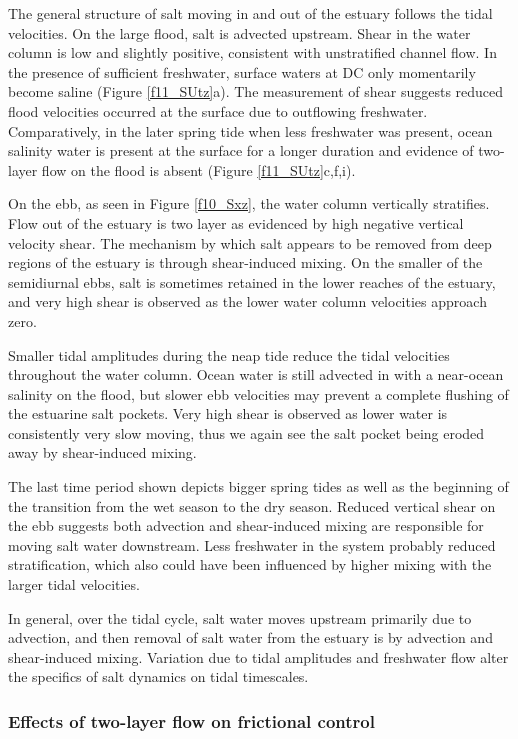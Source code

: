 The general structure of salt moving in and out of the estuary follows
the tidal velocities. On the large flood, salt is advected upstream.
Shear in the water column is low and slightly positive, consistent
with unstratified channel flow. In the presence of sufficient freshwater,
surface waters at DC only momentarily become saline (Figure \ref{f11_SUtz}a).
The measurement of shear suggests reduced flood velocities occurred
at the surface due to outflowing freshwater. Comparatively, in the
later spring tide when less freshwater was present, ocean salinity
water is present at the surface for a longer duration and evidence
of two-layer flow on the flood is absent (Figure \ref{f11_SUtz}c,f,i). 

On the ebb, as seen in Figure \ref{f10_Sxz}, the water column vertically
stratifies. Flow out of the estuary is two layer as evidenced by high
negative vertical velocity shear. The mechanism by which salt appears
to be removed from deep regions of the estuary is through shear-induced
mixing. On the smaller of the semidiurnal ebbs, salt is sometimes
retained in the lower reaches of the estuary, and very high shear
is observed as the lower water column velocities approach zero. 

Smaller tidal amplitudes during the neap tide reduce the tidal velocities
throughout the water column. Ocean water is still advected in with
a near-ocean salinity on the flood, but slower ebb velocities may
prevent a complete flushing of the estuarine salt pockets. Very high
shear is observed as lower water is consistently very slow moving,
thus we again see the salt pocket being eroded away by shear-induced
mixing. 

The last time period shown depicts bigger spring tides as well as
the beginning of the transition from the wet season to the dry season.
Reduced vertical shear on the ebb suggests both advection and shear-induced
mixing are responsible for moving salt water downstream. Less freshwater
in the system probably reduced stratification, which also could have
been influenced by higher mixing with the larger tidal velocities. 

In general, over the tidal cycle, salt water moves upstream primarily
due to advection, and then removal of salt water from the estuary
is by advection and shear-induced mixing. Variation due to tidal amplitudes
and freshwater flow alter the specifics of salt dynamics on tidal
timescales. 


\subsubsection{Effects of two-layer flow on frictional control}

